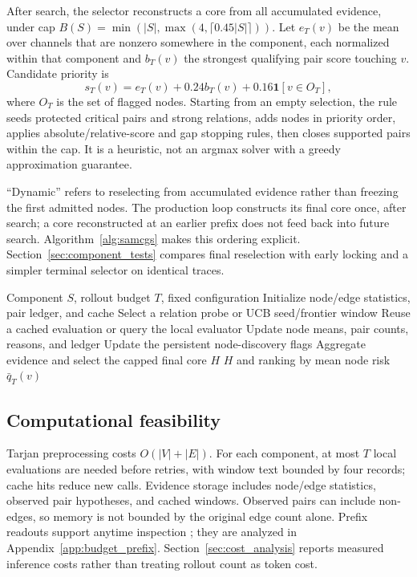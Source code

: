 \begin{revadded}
After search, the selector reconstructs a core from all accumulated evidence, under cap $B(S)=\min(|S|,\max(4,\lceil0.45|S|\rceil))$. Let $e_T(v)$ be the mean over channels that are nonzero somewhere in the component, each normalized within that component and $b_T(v)$ the strongest qualifying pair score touching $v$. Candidate priority is
\begin{equation}
 s_T(v)=e_T(v)+0.24b_T(v)+0.16\mathbf{1}[v\in O_T],
 \label{eq:priority}
\end{equation}
where $O_T$ is the set of flagged nodes. Starting from an empty selection, the rule seeds protected critical pairs and strong relations, adds nodes in priority order, applies absolute/relative-score and gap stopping rules, then closes supported pairs within the cap. It is a heuristic, not an argmax solver with a greedy approximation guarantee.

``Dynamic'' refers to reselecting from accumulated evidence rather than freezing the first admitted nodes. The production loop constructs its final core once, after search; a core reconstructed at an earlier prefix does not feed back into future search. Algorithm~\ref{alg:samcgs} makes this ordering explicit. Section~\ref{sec:component_tests} compares final reselection with early locking and a simpler terminal selector on identical traces.

\begin{algorithm}[t]
\small
\caption{\samcgs{} for one strongly connected component}
\label{alg:samcgs}
\begin{algorithmic}[1]
\REQUIRE Component $S$, rollout budget $T$, fixed configuration
\STATE Initialize node/edge statistics, pair ledger, and cache
 \STATE Select a relation probe or UCB seed/frontier window
 \STATE Reuse a cached evaluation or query the local evaluator
 \STATE Update node means, pair counts, reasons, and ledger
 \STATE Update the persistent node-discovery flags
\ENDFOR
\STATE Aggregate evidence and select the capped final core $H$
\RETURN $H$ and ranking by mean node risk $\bar q_T(v)$
\end{algorithmic}
\end{algorithm}

\subsection{Computational feasibility}

Tarjan preprocessing costs $O(|V|+|E|)$. For each component, at most $T$ local evaluations are needed before retries, with window text bounded by four records; cache hits reduce new calls. Evidence storage includes node/edge statistics, observed pair hypotheses, and cached windows. Observed pairs can include non-edges, so memory is not bounded by the original edge count alone. Prefix readouts support anytime inspection \citep{zilberstein1996anytime}; they are analyzed in Appendix~\ref{app:budget_prefix}. Section~\ref{sec:cost_analysis} reports measured inference costs rather than treating rollout count as token cost.
\end{revadded}
